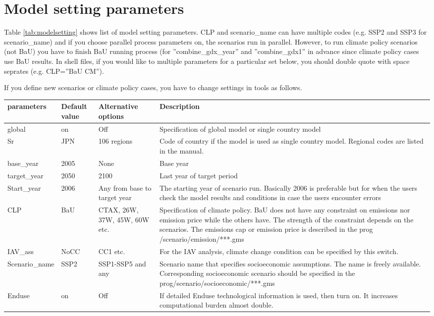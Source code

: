 \documentclass[10pt,a4paper,titlepage,dvipdfmx]{book}
\begin{document}
\section{\label{sec:ModSetPar}Model setting parameters}

Table \ref{tab:modelsetting} shows list of model setting parameters. CLP and scenario\_name can have multiple codes (e.g. SSP2 and SSP3 for scenario\_name) and if you choose parallel process parameters on, the scenarios run in parallel. However, to run climate policy scenarios (not BaU) you have to finish BaU running process (for ''combine\_gdx\_year'' and ''combine\_gdx1'' in advance since climate policy cases use BaU results. In shell files, if you would like to multiple parameters for a particular set below, you should double quote with space seprates (e.g. CLP=''BaU CM'').

If you define new scenarios or climate policy cases, you have to change settings in tools as follows.


\begin{tabularx}{\textwidth}{|
p{}|
p{}|
p{}|
p{}|} 
\caption{model setting parameters\label{tab:modelsetting}} \\
\hline 
parameters & Default value & Alternative options & Description \\\hline 
global & on & Off & Specification of global model or single country model \\\hline 
Sr & JPN & 106 regions & Code of country if the model is used as single country model. Regional codes are listed in the manual. \\\hline 
base\_year & 2005 & None & Base year \\\hline 
target\_year & 2050 & 2100 & Last year of target period \\\hline 
Start\_year & 2006 & Any from base to target year & The starting year of scenario run. Basically 2006 is preferable but for when the users check the model results and conditions in case the users encounter errors \\\hline 
CLP & BaU & CTAX, 26W, 37W, 45W, 60W etc. & Specification of climate policy. BaU does not have any constraint on emissions nor emission price while the others have. The strength of the constraint depends on the scenarios. The emissions cap or emission price is described in the prog /scenario/emission/***.gms \\\hline 
IAV\_ass & NoCC & CC1 etc. & For the IAV analysis, climate change condition can be specified by this switch. \\\hline 
Scenario\_name & SSP2 & SSP1-SSP5 and any & Scenario name that specifies socioeconomic assumptions. The name is freely available. Corresponding socioeconomic scenario should be specified in the prog/scenario/socioeconomic/***.gms  \\\hline 
Enduse & on & Off & If detailed Enduse technological information is used, then turn on. It increases computational burden almost double. \\\hline 
\end{tabularx}
\end{document}
